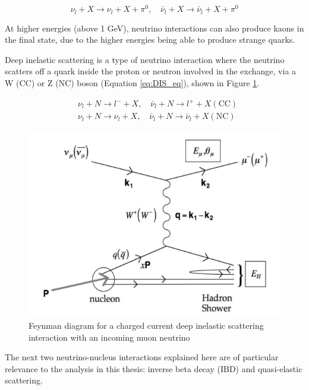 \begin{equation}
\nu_{l}+X \rightarrow \nu_{l}+X+\pi^{0}, \quad \bar{\nu}_{l}+X \rightarrow \bar{\nu}_{l}+X+\pi^{0}
\label{eq:single_pion_NC}
\end{equation}

At higher energies (above 1 GeV), neutrino interactions can also produce kaons in the final state, due to the higher energies being able to produce strange quarks. 

Deep inelastic scattering is a type of neutrino interaction where the neutrino scatters off a quark inside the proton or neutron involved in the exchange, via a W (CC) or Z (NC) boson (Equation \ref{eq:DIS_eq}), shown in Figure \ref{fig:CC_DIS}.

$$
\begin{aligned}
&\nu_{l}+N \rightarrow l^{-}+X, \quad \bar{\nu}_{l}+N \rightarrow l^{+}+X(\mathrm{CC}) \\
&\nu_{l}+N \rightarrow \nu_{l}+X, \quad \bar{\nu}_{l}+N \rightarrow \bar{\nu}_{l}+X(\mathrm{NC})
\end{aligned}
\label{eq:DIS_eq}
$$

\begin{figure}
    \includegraphics[width=\textwidth]{Figures/CC_DIS.png}
    \caption{Feynman diagram for a charged current deep inelastic scattering interaction with an incoming muon neutrino}
    \label{fig:CC_DIS}
\end{figure}


The next two neutrino-nucleus interactions explained here are of particular relevance to the analysis in this thesis: inverse beta decay (IBD) and quasi-elastic scattering. 

